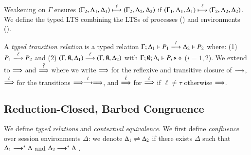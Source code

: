Weakening on $\Gamma$ ensures
$(\Gamma_2, \Lambda_1, \Delta_1) \stackrel{\ell}{\longmapsto} (\Gamma_2, \Lambda_2, \Delta_2)$
if
$(\Gamma_1, \Lambda_1, \Delta_1) \stackrel{\ell}{\longmapsto} (\Gamma_2, \Lambda_2, \Delta_2)$.
We define the typed LTS combining 
the LTSs of processes 
()
and environments
(). 

\smallskip

\begin{definition}\label{d:tlts}\rm
A {\em typed transition relation} is a typed relation
$\Gamma; \Delta_1 \vdash P_1 \stackrel{\ell}{\longrightarrow} \Delta_2 \vdash P_2$
	where:
%
(1) $P_1 \stackrel{\ell}{\longrightarrow} P_2$ and (2) 
$(\Gamma, \emptyset, \Delta_1) \stackrel{\ell}{\longrightarrow} (\Gamma, \emptyset, \Delta_2)$ 
with $\Gamma; \emptyset; \Delta_i \vdash P_i \triangleright \diamond$ 
($i=1,2$).
%
%
We extend to $\stackrel{}{\Longrightarrow}$ 
and $\stackrel{\hat{\ell}}{\Longrightarrow}$ 
where we write 
$\stackrel{}{\Longrightarrow}$ for the reflexive and
transitive closure of $\stackrel{}{\longrightarrow}$, $\stackrel{\ell}{\Longrightarrow}$ for the transitions
$\stackrel{}{\Longrightarrow}\stackrel{\ell}{\longrightarrow}\stackrel{}{\Longrightarrow}$, and $\stackrel{\hat{\ell}}{\Longrightarrow}$ for $\stackrel{\ell}{\Longrightarrow}$ if
$\ell\not = \tau$ otherwise $\stackrel{}{\Longrightarrow}$. 
\end{definition}

\subsection{Reduction-Closed, Barbed Congruence}
\label{subsec:rc}
\noi We define \emph{typed relations} and \emph{contextual equivalence}.  
We first define \emph{confluence}
over session environments $\Delta$:
we denote $\Delta_1 \rightleftharpoons \Delta_2$ if there exists $\Delta$ such that
	$\Delta_1 \longrightarrow^\ast \Delta$ and $\Delta_2 \longrightarrow^\ast \Delta$
	.

